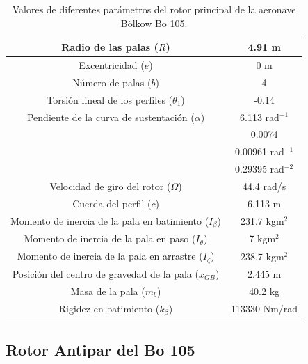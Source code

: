 \begin{table}[]
	\centering
	\begin{tabular}{|>{\columncolor{Gray}}c|c|}
		\hline
		Radio de las palas ($R$) & 4.91 m \\ \hline
		Excentricidad ($e$) & 0 m \\ \hline
		Número de palas ($b$) & 4 \\ \hline
		Torsión lineal de los perfiles ($\theta_1$) & -0.14 \\ \hline
		Pendiente de la curva de sustentación ($\alpha$) & 6.113 rad$^{-1}$ \\ \hline
		\cellcolor{Gray} & 0.0074 \\ \cline{2-2} 
		\cellcolor{Gray} & 0.00961 rad$^{-1}$ \\ \cline{2-2} 
		\multirow{-3}{*}{\cellcolor{Gray}Parámetros de la polar ($\delta_0$, $\delta_1$, $\delta_2$)} & 0.29395 rad$^{-2}$ \\ \hline
		Velocidad de giro del rotor ($\Omega$) & 44.4 rad/s \\ \hline
		Cuerda del perfil ($c$) & 6.113 m \\ \hline
		Momento de inercia de la pala en batimiento ($I_\beta$) & 231.7 kgm$^2$ \\ \hline
		Momento de inercia de la pala en paso ($I_\theta$) & 7 kgm$^2$ \\ \hline
		Momento de inercia de la pala en arrastre ($I_\zeta$) & 238.7 kgm$^2$ \\ \hline
		Posición del centro de gravedad de la pala ($x_{GB}$) & 2.445 m \\ \hline
		Masa de la pala ($m_b$) & 40.2 kg \\ \hline
		Rigidez en batimiento ($k_\beta$) & 113330 Nm/rad \\ \hline
	\end{tabular}
	\caption{Valores de diferentes parámetros del rotor principal de la aeronave Bölkow Bo 105.}
	\label{RPBo}
\end{table}

\subsection{Rotor Antipar del Bo 105}

